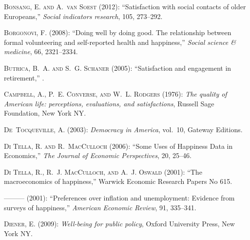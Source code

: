 \documentclass[10pt, letterpaper]{article}
\begin{document}
\begin{spacing}{1.4}
\begin{thebibliography}{91}
\textsc{Bonsang, E. and A.~van Soest} (2012): \enquote{Satisfaction with social
  contacts of older Europeans,} \emph{Social indicators research}, 105,
  273--292.

\textsc{Borgonovi, F.} (2008): \enquote{Doing well by doing good. The
  relationship between formal volunteering and self-reported health and
  happiness,} \emph{Social science \& medicine}, 66, 2321--2334.

\textsc{Butrica, B.~A. and S.~G. Schaner} (2005): \enquote{Satisfaction and
  engagement in retirement,} .

\textsc{Campbell, A., P.~E. Converse, and W.~L. Rodgers} (1976): \emph{The
  quality of American life: perceptions, evaluations, and satisfactions},
  Russell Sage Foundation, New York NY.

\textsc{De~Tocqueville, A.} (2003): \emph{Democracy in America}, vol.~10,
  Gateway Editions.

\textsc{{Di Tella}, R. and R.~MacCulloch} (2006): \enquote{Some Uses of
  Happiness Data in Economics,} \emph{The Journal of Economic Perspectives},
  20, 25--46.

\textsc{{Di Tella}, R., R.~J. MacCulloch, and A.~J. Oswald}
  (2001{}): \enquote{The macroeconomics of happiness,} Warwick
  Economic Research Papers No 615.

---\hspace{-.1pt}---\hspace{-.1pt}--- (2001{}):
  \enquote{Preferences over inflation and unemployment: Evidence from surveys
  of happiness,} \emph{American Economic Review}, 91, 335--341.

\textsc{Diener, E.} (2009): \emph{Well-being for public policy}, Oxford
  University Press, New York NY.


\end{thebibliography}
\end{spacing}
\end{document}
